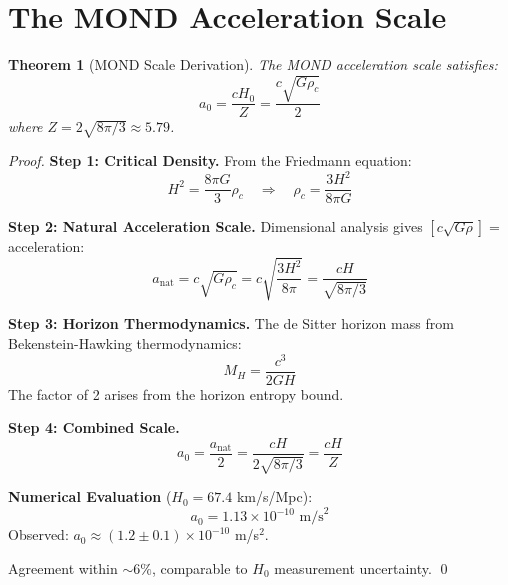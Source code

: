 \documentclass[twocolumn,showpacs,preprintnumbers,amsmath,amssymb,prd]{revtex4-2}
\newtheorem{theorem}{Theorem}[section]
\begin{document}
\section{The MOND Acceleration Scale}

\begin{theorem}[MOND Scale Derivation]
\label{thm:mond}
The MOND acceleration scale satisfies:
\begin{equation}
\boxed{a_0 = \frac{cH_0}{Z} = \frac{c\sqrt{G\rho_c}}{2}}
\end{equation}
where $Z = 2\sqrt{8\pi/3} \approx 5.79$.
\end{theorem}

\begin{proof}
\textbf{Step 1: Critical Density.}
From the Friedmann equation:
\begin{equation}
H^2 = \frac{8\pi G}{3}\rho_c \quad \Rightarrow \quad \rho_c = \frac{3H^2}{8\pi G}
\end{equation}

\textbf{Step 2: Natural Acceleration Scale.}
Dimensional analysis gives $[c\sqrt{G\rho}] = $ acceleration:
\begin{equation}
a_{\text{nat}} = c\sqrt{G\rho_c} = c\sqrt{\frac{3H^2}{8\pi}} = \frac{cH}{\sqrt{8\pi/3}}
\end{equation}

\textbf{Step 3: Horizon Thermodynamics.}
The de Sitter horizon mass from Bekenstein-Hawking thermodynamics:
\begin{equation}
M_H = \frac{c^3}{2GH}
\end{equation}
The factor of 2 arises from the horizon entropy bound.

\textbf{Step 4: Combined Scale.}
\begin{equation}
a_0 = \frac{a_{\text{nat}}}{2} = \frac{cH}{2\sqrt{8\pi/3}} = \frac{cH}{Z}
\end{equation}

\textbf{Numerical Evaluation} ($H_0 = 67.4$ km/s/Mpc):
\begin{equation}
a_0 = 1.13 \times 10^{-10} \text{ m/s}^2
\end{equation}
Observed: $a_0 \approx (1.2 \pm 0.1) \times 10^{-10}$ m/s$^2$.

Agreement within $\sim 6\%$, comparable to $H_0$ measurement uncertainty.
\qed
\end{proof}
\end{document}
